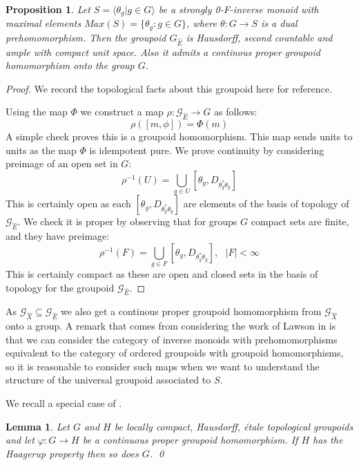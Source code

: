 \documentclass[11pt,]{amsbook}
\theoremstyle{plain}
\newtheorem{lemma}[theorem]{Lemma}%
\newtheorem{proposition}[theorem]{Proposition}%
\theoremstyle{definition}%
\theoremstyle{remark}%
\newcommand{\G}{\mathcal{G}}
\newcommand{\E}{\widehat{E}}
\begin{document}
\begin{proposition}\label{Prop:GrpoidHom}
Let $S = \langle \theta_{g} | g \in G \rangle$ be a strongly 0-F-inverse monoid with maximal elements $Max(S)= \lbrace \theta_{g}:g \in G \rbrace$, where $\theta: G \rightarrow S$ is a dual prehomomorphism. Then the groupoid $G_{\E}$ is Hausdorff, second countable and ample with compact unit space. Also it admits a continous proper groupoid homomorphism onto the group $G$.
\end{proposition}
\begin{proof}
We record the topological facts about this groupoid here for reference.

Using the map $\Phi$ we construct a map $\rho: \G_{\E} \rightarrow G$ as follows:
\begin{equation*}
\rho([m,\phi]) = \Phi(m)
\end{equation*}
A simple check proves this is a groupoid homomorphism. This map sends units to units as the map $\Phi$ is idempotent pure. We prove continuity by considering preimage of an open set in $G$:
\begin{equation*}
\rho^{-1}(U)=\bigcup_{g \in U}[\theta_{g},D_{\theta^{*}_{g}\theta_{g}}]
\end{equation*}
This is certainly open as each $[\theta_{g},D_{\theta^{*}_{g}\theta_{g}}]$ are elements of the basis of topology of $\G_{\E}$. We check it is proper by observing that for groups $G$ compact sets are finite, and they have preimage:
\begin{equation*}
\rho^{-1}(F)=\bigcup_{g \in F}[\theta_{g},D_{\theta^{*}_{g}\theta_{g}}], \mbox{ } \vert F \vert < \infty 
\end{equation*}
This is certainly compact as these are open and closed sets in the basis of topology for the groupoid $\G_{\E}$.\end{proof}

As $\G_{\widehat{X}} \subseteq \G_{\E}$ we also get a continous proper groupoid homomorphism from $\G_{\widehat{X}}$ onto a group.  A remark that comes from considering the work of Lawson in \cite{MR1694900} is that we can consider the category of inverse monoids with prehomomorphisms equivalent to the category of ordered groupoids with groupoid homomorphisms, so it is reasonable to consider such maps when we want to understand the structure of the universal groupoid associated to $S$. 

We recall a special case of \cite[Lemme 3.12]{MR1703305}.

\begin{lemma}\label{Lem:Lemme}
Let $G$ and $H$ be locally compact, Hausdorff, \'etale topological groupoids and let $\varphi: G \rightarrow H$ be a continuous proper groupoid homomorphism. If $H$ has the Haagerup property then so does $G$. \qed
\end{lemma}
\end{document}
